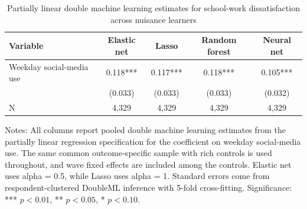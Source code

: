 \begin{table}[!htbp]
\centering
\caption{Partially linear double machine learning estimates for school-work dissatisfaction across nuisance learners}
\label{tab:dml_schoolwork_methods}
\begin{tabular}{lcccc}
\hline
Variable & Elastic net & Lasso & Random forest & Neural net
\\
\hline
Weekday social-media use & 0.118*** & 0.117*** & 0.118*** & 0.105***
\\
 & (0.033) & (0.033) & (0.033) & (0.032)
\\
N & 4,329 & 4,329 & 4,329 & 4,329
\\
\hline
\end{tabular}
\begin{minipage}{0.95\textwidth}
\footnotesize Notes: All columns report pooled double machine learning estimates from the partially linear regression specification for the coefficient on weekday social-media use. The same common outcome-specific sample with rich controls is used throughout, and wave fixed effects are included among the controls. Elastic net uses alpha = 0.5, while Lasso uses alpha = 1. Standard errors come from respondent-clustered DoubleML inference with 5-fold cross-fitting. Significance: *** \(p < 0.01\), ** \(p < 0.05\), * \(p < 0.10\).
\end{minipage}
\end{table}
